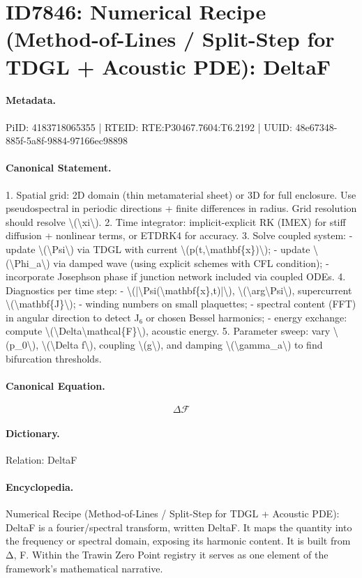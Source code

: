 \section*{ID7846: Numerical Recipe (Method-of-Lines / Split-Step for TDGL + Acoustic PDE): DeltaF}
\paragraph{Metadata.}
PiID: 4183718065355 | RTEID: RTE:P30467.7604:T6.2192 | UUID: 48e67348-885f-5a8f-9884-97166ec98898

\paragraph{Canonical Statement.}
1. Spatial grid: 2D domain (thin metamaterial sheet) or 3D for full enclosure. Use pseudospectral in periodic directions + finite differences in radius. Grid resolution should resolve \textbackslash{}(\textbackslash{}xi\textbackslash{}). 2. Time integrator: implicit-explicit RK (IMEX) for stiff diffusion + nonlinear terms, or ETDRK4 for accuracy. 3. Solve coupled system: - update \textbackslash{}(\textbackslash{}Psi\textbackslash{}) via TDGL with current \textbackslash{}(p(t,\textbackslash{}mathbf\{x\})\textbackslash{}); - update \textbackslash{}(\textbackslash{}Phi\_a\textbackslash{}) via damped wave (using explicit schemes with CFL condition); - incorporate Josephson phase if junction network included via coupled ODEs. 4. Diagnostics per time step: - \textbackslash{}(|\textbackslash{}Psi(\textbackslash{}mathbf\{x\},t)|\textbackslash{}), \textbackslash{}(\textbackslash{}arg\textbackslash{}Psi\textbackslash{}), supercurrent \textbackslash{}(\textbackslash{}mathbf\{J\}\textbackslash{}); - winding numbers on small plaquettes; - spectral content (FFT) in angular direction to detect J₆ or chosen Bessel harmonics; - energy exchange: compute \textbackslash{}(\textbackslash{}Delta\textbackslash{}mathcal\{F\}\textbackslash{}), acoustic energy. 5. Parameter sweep: vary \textbackslash{}(p\_0\textbackslash{}), \textbackslash{}(\textbackslash{}Delta f\textbackslash{}), coupling \textbackslash{}(g\textbackslash{}), and damping \textbackslash{}(\textbackslash{}gamma\_a\textbackslash{}) to find bifurcation thresholds.

\paragraph{Canonical Equation.}
\[
\Delta\mathcal{F}
\]

\paragraph{Dictionary.}
Relation: DeltaF

\paragraph{Encyclopedia.}
Numerical Recipe (Method-of-Lines / Split-Step for TDGL + Acoustic PDE): DeltaF is a fourier/spectral transform, written DeltaF. It maps the quantity into the frequency or spectral domain, exposing its harmonic content. It is built from Δ, F. Within the Trawin Zero Point registry it serves as one element of the framework's mathematical narrative.
